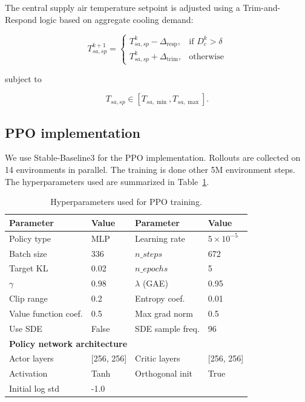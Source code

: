 \documentclass[10pt]{article} %
\begin{document}
\begin{itemize}
The central supply air temperature setpoint is adjusted using a Trim-and-Respond
logic based on aggregate cooling demand:

\begin{equation}
T_{sa,sp}^{k+1} =
\begin{cases}
T_{sa,sp}^{k} - \Delta_{\text{resp}}, & \text{if } D_c^k > \delta \\
T_{sa,sp}^{k} + \Delta_{\text{trim}}, & \text{otherwise}
\end{cases}
\end{equation}

subject to

\begin{equation}
T_{sa,sp} \in [T_{sa,\min}, T_{sa,\max}].
\end{equation}
    

\subsection{PPO implementation}

We use Stable-Baseline3 \cite{stable-baselines3} for the PPO implementation. Rollouts are collected on 14 environments in parallel. The training is done other 5M environment steps. The hyperparameters used are summarized in Table~\ref{tab:ppo_hyperparameters}.

\begin{table}[h]
\centering
\small
\caption{Hyperparameters used for PPO training.}
\label{tab:ppo_hyperparameters}
\begin{tabular}{ll ll}
\toprule
\textbf{Parameter} & \textbf{Value} & \textbf{Parameter} & \textbf{Value} \\
\midrule
Policy type & MLP & Learning rate & $5\times10^{-5}$ \\
Batch size & 336 & $n\_steps$ & 672 \\
Target KL & 0.02 & $n\_epochs$ & 5 \\
$\gamma$ & 0.98 & $\lambda$ (GAE) & 0.95 \\
Clip range & 0.2 & Entropy coef. & 0.01 \\
Value function coef. & 0.5 & Max grad norm & 0.5 \\
Use SDE & False & SDE sample freq. & 96 \\
\midrule
\multicolumn{4}{l}{\textbf{Policy network architecture}} \\
\midrule
Actor layers & [256, 256] & Critic layers & [256, 256] \\
Activation & Tanh & Orthogonal init & True \\
Initial log std & -1.0 & & \\
\bottomrule
\end{tabular}
\end{table}


\end{itemize}
\end{document}
